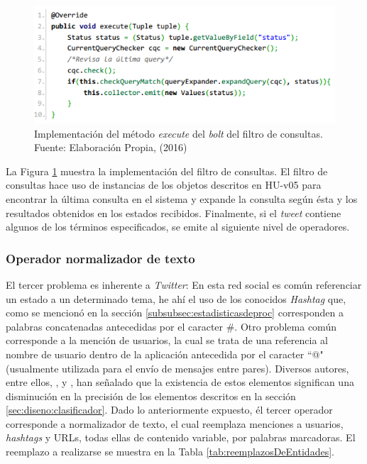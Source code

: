 \begin{figure}[H]
	\centering
	\captionsetup{justification=centering}
	\includegraphics[scale=0.8]{images/FilterBolt.png}
	\caption[Implementación del método \textit{execute} del \textit{bolt} del filtro de consultas.]{Implementación del método \textit{execute} del \textit{bolt} del filtro de consultas.\\Fuente: Elaboración Propia, (2016)}
	\label{fig:operadorFiltro}
\end{figure}

La Figura \ref{fig:operadorFiltro} muestra la implementación del filtro de consultas. El filtro de consultas hace uso de instancias de los objetos descritos en HU-v05 para encontrar la última consulta en el sistema y expande la consulta según ésta y los resultados obtenidos en los estados recibidos. Finalmente, si el \textit{tweet} contiene algunos de los términos especificados, se emite al siguiente nivel de operadores.

\subsubsection*{Operador normalizador de texto}
\label{subsubsec:3op}

El tercer problema es inherente a \textit{Twitter}: En esta red social es común referenciar un estado a un determinado tema, he ahí el uso de los conocidos \textit{Hashtag} que, como se mencionó en la sección \ref{subsubsec:estadisticasdeproc} corresponden a palabras concatenadas antecedidas por el caracter \#. Otro problema común corresponde a la mención de usuarios, la cual se trata de una referencia al nombre de usuario dentro de la aplicación antecedida por el caracter ``@" (usualmente utilizada para el envío de mensajes entre pares). Diversos autores, entre ellos, \cite{NLPaccuracy}, \cite{NLPaccuracy1} y \cite{NLPaccuracy2}, han señalado que la existencia de estos elementos significan una disminución en la precisión de los elementos descritos en la sección \ref{sec:diseno:clasificador}. Dado lo anteriormente expuesto, él tercer operador corresponde a normalizador de texto, el cual reemplaza menciones a usuarios, \textit{hashtags} y URLs, todas ellas de contenido variable, por palabras marcadoras. El reemplazo a realizarse se muestra en la Tabla \ref{tab:reemplazosDeEntidades}.


